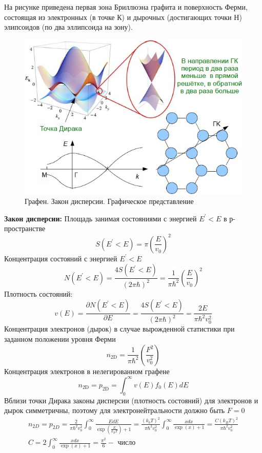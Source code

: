 На рисунке приведена первая зона Бриллюэна графита и поверхность Ферми, состоящая из электронных (в точке К) и дырочных (достигающих точки Н) элипсоидов (по два эллипсоида на зону).

\begin{figure}[h!]
\centering
 \includegraphics[width=\textwidth]{images/ph31.3.jpg}
 \caption*{Графен. Закон дисперсии. Графическое представление}
\end{figure}


\textbf{Закон дисперсии:}
Площадь занимая состояниями с энергией $E^{\prime}<E$ в р-пространстве
$$
S\left(E^{\prime}<E\right)=\pi\left(\frac{E}{v_0}\right)^2
$$
Концентрация состояний с энергией $E^{\prime}<E$
$$
N\left(E^{\prime}<E\right)=\frac{4 S\left(E^{\prime}<E\right)}{(2 \pi \hbar)^2}=\frac{1}{\pi \hbar^2}\left(\frac{E}{v_0}\right)^2
$$
Плотность состояний:
$$
v(E)=\frac{\partial N\left(E^{\prime}<E\right)}{\partial E}=\frac{4 S\left(E^{\prime}<E\right)}{(2 \pi \hbar)^2}=\frac{2 E}{\pi \hbar^2 v_0^2}
$$
Концентрация электронов (дырок) в случае вырожденной статистики при заданном положении уровня Ферми
$$
n_{2 \mathrm{D}}=\frac{1}{\pi \hbar^2}\left(\frac{F^2}{v_0^2}\right)
$$
Концентрация электронов в нелегированном графене
$$
n_{2 \mathrm{D}}=p_{2 \mathrm{D}}=\int_0^{\infty} v(E) f_0(E) d E
$$
Вблизи точки Дирака законы дисперсии (плотность состояний) для электронов и дырок симметричны, поэтому для электронейтральности должно быть $F=0$
$$
\begin{gathered}
n_{2 D}=p_{2 D}=\frac{2}{\pi \hbar^2 v_0^2} \int_0^{\infty} \frac{E d E}{\exp \left(\frac{E}{k_B T}\right)+1}=\frac{\left(k_b T\right)^2}{\pi \hbar^2 v_0^2} \int_0^{\infty} \frac{x d x}{\exp (x)+1}=\frac{C\left(k_B T\right)^2}{\pi \hbar^2 v_0^2} \\
C=2 \int_0^{\infty} \frac{x d x}{\exp (x)+1}=\frac{\pi^2}{6}-\text { число }
\end{gathered}
$$

